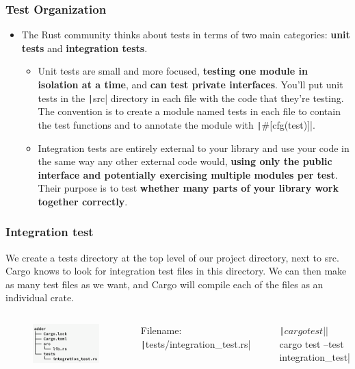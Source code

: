 \documentclass{beamer}
\begin{document}
\begin{frame}[fragile]
	\frametitle{Test Organization}
	\begin{itemize}
		\item The Rust community thinks about tests in terms of two main categories: \textbf{unit tests} and \textbf{integration tests}. 
		\begin{itemize}
			\item Unit tests are small and more focused, \textbf{testing one module in isolation at a time}, and \textbf{can test private interfaces}.  You’ll put unit tests in the \texttt|src| directory in each file with the code that they’re testing. The convention is to create a module named tests in each file to contain the test functions and to annotate the module with \texttt|#[cfg(test)]|.
			\item Integration tests are entirely external to your library and use your code in the same way any other external code would,\textbf{ using only the public interface and potentially exercising multiple modules per test}. Their purpose is to test \textbf{whether many parts of your library work together correctly}.
		\end{itemize}
	\end{itemize}
\end{frame}


\begin{frame}[fragile]
	\frametitle{Integration test}
	We create a tests directory at the top level of our project directory, next to src. Cargo knows to look for integration test files in this directory. We can then make as many test files as we want, and Cargo will compile each of the files as an individual crate.
	
	
	\begin{columns}
		\begin{figure}
			\centering
			\includegraphics[width=0.8\linewidth]{img/test.png}
		\end{figure}
		\scriptsize
		Filename: \texttt|tests/integration_test.rs|
		\inputminted[fontsize=\scriptsize]{rust}{./code/test9.rs}
		
		\texttt|$ cargo test|
		
		\texttt|$ cargo test --test integration_test|
	\end{columns}
\end{frame}
\end{document}

